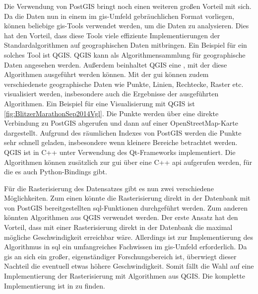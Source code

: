 Die Verwendung von PostGIS bringt noch einen weiteren großen Vorteil mit sich.
Da die Daten nun in einem im \acrshort{gis}-Umfeld gebräuchlichen Format vorliegen, können beliebige \acrshort{gis}-Tools verwendet werden, um die Daten zu analysieren.
Dies hat den Vorteil, dass diese Tools viele effiziente Implementierungen der Standardalgorithmen auf geographischen Daten mitbringen.
Ein Beispiel für ein solches Tool ist QGIS.
QGIS kann als Algorithmensammlung für geographische Daten angesehen werden.
Außerdem beinhaltet QGIS eine , mit der diese Algorithmen ausgeführt werden können.
Mit der \acrshort{gui} können zudem verschiedenste geographische Daten wie Punkte, Linien, Rechtecke, Raster etc. visualisiert werden, insbesondere auch die Ergebnisse der ausgeführten Algorithmen.
Ein Beispiel für eine Visualisierung mit QGIS ist \autoref{fig:BlitzerMarathonSep2014Vgl}.
Die Punkte werden über eine direkte Verbindung zu PostGIS abgerufen und dann auf einer OpenStreetMap-Karte dargestellt.
Aufgrund des räumlichen Indexes von PostGIS werden die Punkte sehr schnell geladen, insbesondere wenn kleinere Bereiche betrachtet werden.
QGIS ist in C++ unter Verwendung des Qt-Frameworks implementiert.
Die Algorithmen können zusätzlich zur \acrshort{gui} über eine C++ \acrshort{api} aufgerufen werden, für die es auch Python-Bindings gibt.

Für die Rasterisierung des Datensatzes gibt es nun zwei verschiedene Möglichkeiten.
Zum einen könnte die Rasterisierung direkt in der Datenbank mit von PostGIS bereitgestellten \acrshort{sql}-Funktionen durchgeführt werden.
Zum anderen könnten Algorithmen aus QGIS verwendet werden.
Der erste Ansatz hat den Vorteil, dass mit einer Rasterisierung direkt in der Datenbank die maximal mögliche Geschwindigkeit erreichbar wäre.
Allerdings ist zur Implementierung des Algorithmus in \acrshort{sql} ein umfangreiches Fachwissen im \acrshort{gis}-Umfeld erforderlich.
Da \acrshort{gis} an sich ein großer, eigenständiger Forschungsbereich ist, überwiegt dieser Nachteil die eventuell etwas höhere Geschwindigkeit.
Somit fällt die Wahl auf eine Implementierung der Rasterisierung mit Algorithmen aus QGIS.
Die komplette Implementierung ist in  zu finden.

